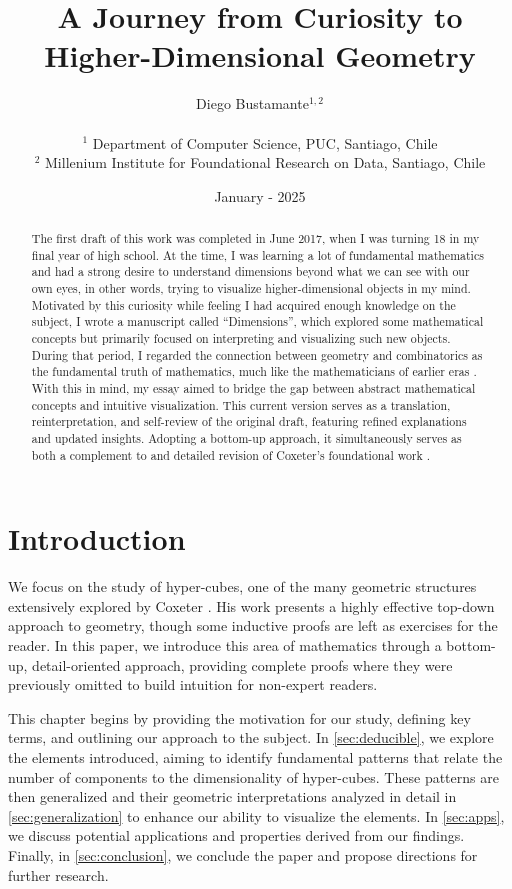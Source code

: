 \documentclass{article}
\title{A Journey from Curiosity to Higher-Dimensional Geometry}
\date{January - 2025}
\author{%
	Diego Bustamante$^{1,2}$\\ \\
	{$^1$ Department of Computer Science, PUC, Santiago, Chile}\\
	{$^2$ Millenium Institute for Foundational Research on Data, Santiago, Chile}\\
}
\begin{document}
	\setcounter{page}{1}
	
	\maketitle

	\begin{abstract}
		The first draft of this work was completed in June 2017, when I was turning 18 in my final year of high school. At the time, I was learning a lot of fundamental mathematics and had a strong desire to understand dimensions beyond what we can see with our own eyes, in other words, trying to visualize higher-dimensional objects in my mind. Motivated by this curiosity while feeling I had acquired enough knowledge on the subject, I wrote a manuscript called ``Dimensions'', which explored some mathematical concepts but primarily focused on interpreting and visualizing such new objects. During that period, I regarded the connection between geometry and combinatorics as the fundamental truth of mathematics, much like the mathematicians of earlier eras \cite{euclid}. With this in mind, my essay aimed to bridge the gap between abstract mathematical concepts and intuitive visualization. This current version serves as a translation, reinterpretation, and self-review of the original draft, featuring refined explanations and updated insights. Adopting a bottom-up approach, it simultaneously serves as both a complement to and detailed revision of Coxeter's foundational work \cite{coxeter1973regular}.
	\end{abstract}

	\section{Introduction \label{sec:intro}}
	
	We focus on the study of hyper-cubes, one of the many geometric structures extensively explored by Coxeter \cite{coxeter1973regular}. His work presents a highly effective top-down approach to geometry, though some inductive proofs are left as exercises for the reader. In this paper, we introduce this area of mathematics through a bottom-up, detail-oriented approach, providing complete proofs where they were previously omitted to build intuition for non-expert readers.
	
	This chapter begins by providing the motivation for our study, defining key terms, and outlining our approach to the subject. In \autoref{sec:deducible}, we explore the elements introduced, aiming to identify fundamental patterns that relate the number of components to the dimensionality of hyper-cubes. These patterns are then generalized and their geometric interpretations analyzed in detail in \autoref{sec:generalization} to enhance our ability to visualize the elements. In \autoref{sec:apps}, we discuss potential applications and properties derived from our findings. Finally, in \autoref{sec:conclusion}, we conclude the paper and propose directions for further research.
		
\end{document}
